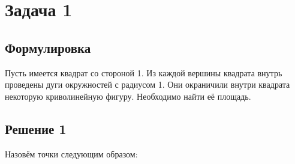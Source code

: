 \documentclass[11pt]{article}
\begin{document}
\section{Задача 1}
\subsection{Формулировка}
Пусть имеется квадрат со стороной 1. Из каждой вершины квадрата внутрь проведены дуги окружностей с радиусом 1. Они окраничили внутри квадрата некоторую криволинейную фигуру. Необходимо найти её площадь.


\subsection{Решение 1}
Назовём точки следующим образом:

\end{document}

